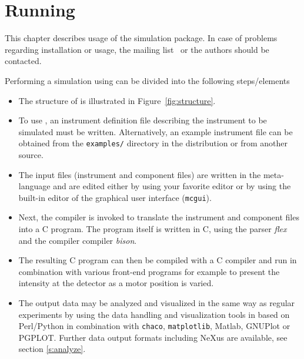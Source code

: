 
\chapter{Running \MCS}
\label{c:running}



This chapter describes usage of the \MCS simulation package. 
In case of problems regarding installation or usage, the \MCS mailing
list~\cite{mcstas_webpage} or the authors should be contacted.

Performing a simulation using \MCS can be divided into the following
steps/elements
\begin{itemize}
\item{The structure of \MCS is illustrated in
    Figure~\ref{fig:structure}.}
\item{To use \MCS, an instrument
definition file describing the instrument to be simulated must be
written. Alternatively, an example instrument file can be obtained
from the \verb+examples/+ directory in the distribution or from
another source.}
\item{The input files (instrument and component files) are written in the \MCS
meta-language and are edited either by using your favorite editor
or by using the built-in editor of the graphical user interface
(\texttt{mcgui}).}
\item{Next, the \MCS compiler \mcs is invoked to translate the instrument and component files into a C program. The program \mcs itself is written in C, using the parser \textit{flex} and the compiler compiler \textit{bison}.}
\item{The resulting C program can then be
compiled with a C compiler and run in combination with various
front-end programs for example to present the intensity at the
detector as a motor position is varied.}
\item{The output data may be analyzed and visualized in the same way as regular
    experiments by using the data handling and visualization tools in \MCS
    based on Perl/Python in combination with \verb+chaco+, \verb+matplotlib+,
    Matlab, GNUPlot or PGPLOT. Further data output formats including NeXus
    are available, see section \ref{s:analyze}.}
\end{itemize}


